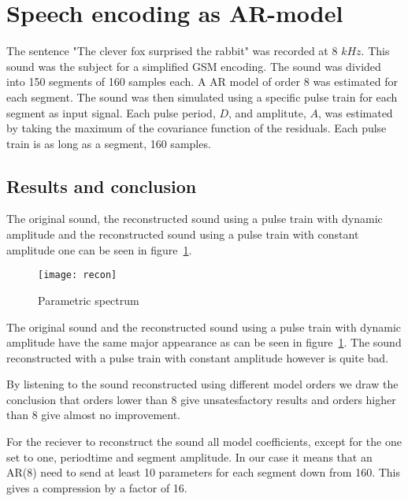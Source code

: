 \documentclass[10pt]{article}
\begin{document}
\section{Speech encoding as AR-model}
The sentence "The clever fox surprised the rabbit" was recorded at
8 $kHz$. This sound was the subject for a simplified GSM encoding.
The sound was divided into 150 segments of 160 samples each. A
AR model of order 8 was estimated for each segment. The sound was
then simulated using a specific pulse train for each segment as
input signal. Each pulse period, $D$, and amplitute, $A$, was
estimated by taking the maximum of the covariance function of the
residuals. Each pulse train is as long as a segment, 160 samples.


\subsection{Results and conclusion}
The original sound, the reconstructed sound using a pulse train with
dynamic amplitude and the reconstructed sound using a pulse train
with constant amplitude one can be seen in figure~\ref{fig:recon}.

\begin{figure}[!hp]

    \begin{center}
      \texttt{[image: recon]}
    \caption{Parametric spectrum \label{fig:recon}}
    \end{center}

\end{figure}

The original sound and the reconstructed sound using a pulse train
with dynamic amplitude have the same major appearance as can be seen in
figure~\ref{fig:recon}. The sound reconstructed with a pulse train with
constant amplitude however is quite bad.

By listening to the sound reconstructed using different model orders
we draw the conclusion that orders lower than $8$ give unsatesfactory
results and orders higher than $8$ give almost no improvement.

For the reciever to reconstruct the sound all model coefficients,
except for the one set to one, periodtime and segment amplitude.
In our case it means that an AR(8) need to send at least 10 parameters
for each segment down from 160. This gives a compression by a
factor of 16.
\end{document}
